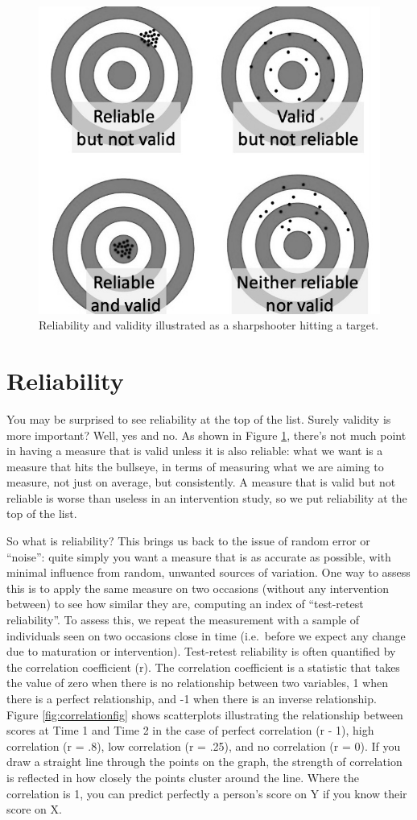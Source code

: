 \documentclass{krantz}
\begin{document}
 

\begin{figure}
\includegraphics[width=0.5\linewidth]{images_bw/targets} \caption{Reliability and validity illustrated as a sharpshooter hitting a target.}\label{fig:darts}
\end{figure}

\hypertarget{reliability-1}{%
\section{Reliability}\label{reliability-1}}

You may be surprised to see reliability at the top of the list. Surely validity is more important? Well, yes and no. As shown in Figure \ref{fig:darts}, there's not much point in having a measure that is valid unless it is also reliable: what we want is a measure that hits the bullseye, in terms of measuring what we are aiming to measure, not just on average, but consistently. A measure that is valid but not reliable is worse than useless in an intervention study, so we put reliability at the top of the list.

So what is reliability? This brings us back to the issue of random error or ``noise'': quite simply you want a measure that is as accurate as possible, with minimal influence from random, unwanted sources of variation. One way to assess this is to apply the same measure on two occasions (without any intervention between) to see how similar they are, computing an index of ``test-retest reliability''. To assess this, we repeat the measurement with a sample of individuals seen on two occasions close in time (i.e.~before we expect any change due to maturation or intervention). Test-retest reliability is often quantified by the correlation coefficient (r). The correlation coefficient is a statistic that takes the value of zero when there is no relationship between two variables, 1 when there is a perfect relationship, and -1 when there is an inverse relationship. Figure \ref{fig:correlationfig} shows scatterplots illustrating the relationship between scores at Time 1 and Time 2 in the case of perfect correlation (r - 1), high correlation (r = .8), low correlation (r = .25), and no correlation (r = 0). If you draw a straight line through the points on the graph, the strength of correlation is reflected in how closely the points cluster around the line. Where the correlation is 1, you can predict perfectly a person's score on Y if you know their score on X.
\end{document}
